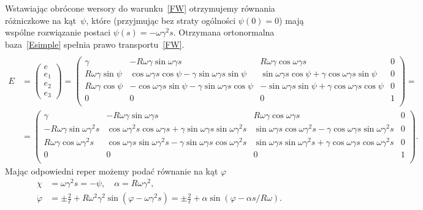 Wstawiając obrócone wersory do warunku~\eqref{FW} otrzymujemy 
równania  różniczkowe na kąt~$\psi$, które 
(przyjmując bez straty ogólności
$\psi(0)=0$) mają wspólne rozwiązanie postaci
$\psi (s) = -\omega \gamma^2 s$.
Otrzymana ortonormalna baza~\eqref{Esimple} spełnia 
prawo transportu~\eqref{FW}.
\begin{align}\label{PsiSimple}
\end{align}
\begin{align}\label{Esimple}
E&=
\begin{pmatrix}
e\\
e_1\\
e_2\\
e_3
\end{pmatrix}
=
\begin{pmatrix}
\gamma  & -R\omega\gamma \sin \omega \gamma s 
& R\omega\gamma \cos\omega\gamma s         & 0 \\
R\omega\gamma \sin \psi  
&  \cos\omega\gamma s \cos\psi 
-\gamma \sin \omega\gamma s \sin\psi &  
\sin\omega\gamma s \cos\psi
+\gamma \cos\omega\gamma s\sin \psi & 0 \\
R\omega\gamma \cos\psi      &  
-\cos\omega\gamma s \sin\psi 
- \gamma \sin\omega\gamma s \cos\psi   &  
-\sin\omega\gamma s \sin\psi 
+ \gamma \cos\omega\gamma s \cos\psi & 0 \\
0 & 0 & 0 & 1 \\
\end{pmatrix} 
=
\\
&=\nonumber
\begin{pmatrix} 
\gamma  & -R\omega\gamma \sin \omega \gamma s 
& R\omega\gamma \cos\omega\gamma s         & 0 \\
-R\omega\gamma \sin\omega\gamma^2 s  
&  \cos\omega\gamma^2 s\cos\omega\gamma s + 
\gamma \sin \omega\gamma s \sin\omega\gamma^2 s &  
\sin\omega\gamma s \cos\omega\gamma^2 s 
- \gamma \cos\omega\gamma s\sin \omega\gamma^2 s & 0 \\
R\omega\gamma \cos\omega\gamma^2 s       &  
\cos\omega\gamma s \sin\omega\gamma^2 s 
- \gamma \sin\omega\gamma s \cos\omega\gamma^2 s   &  
\sin\omega\gamma s \sin\omega\gamma^2 s 
+ \gamma \cos\omega\gamma s \cos\omega\gamma^2 s & 0 \\
0 & 0 & 0 & 1 \\
\end{pmatrix}.
\end{align}
Mając odpowiedni reper możemy podać równanie na kąt $\varphi$
\begin{align*}\nonumber
\chi &= \omega \gamma^2 s = - \psi, \quad \alpha = R \omega \gamma^2, \\
\dot{\varphi} &= \pm \frac{2}{\ell} + \label{phiSimple}
R \omega^2 \gamma^2\sin (\varphi - \omega\gamma^2 s )
= \pm \frac{2}{\ell} +\alpha \sin (\varphi - \alpha s / R\omega ) .
\end{align*}

